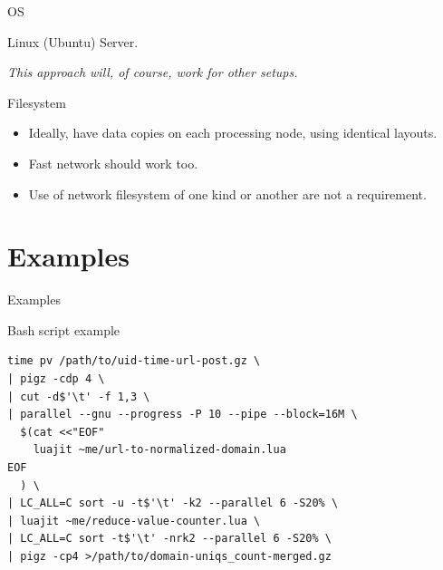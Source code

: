 \documentclass[handout]{beamer}
\begin{document}

\begin{frame}{OS}

\Large Linux (Ubuntu) Server.

\textit{This approach will, of course, work for other setups.}

\end{frame}


\begin{frame}{Filesystem}

\begin{itemize}
\item Ideally, have data copies on each processing node, using identical
      layouts.
\item Fast network should work too.
\item Use of network filesystem of one kind or another are not a requirement.
\end{itemize}

\end{frame}


\section{Examples}


\begin{frame}
\huge Examples
\end{frame}


\begin{frame}[fragile]{Bash script example}

\begin{verbatim}
time pv /path/to/uid-time-url-post.gz \
| pigz -cdp 4 \
| cut -d$'\t' -f 1,3 \
| parallel --gnu --progress -P 10 --pipe --block=16M \
  $(cat <<"EOF"
    luajit ~me/url-to-normalized-domain.lua
EOF
  ) \
| LC_ALL=C sort -u -t$'\t' -k2 --parallel 6 -S20% \
| luajit ~me/reduce-value-counter.lua \
| LC_ALL=C sort -t$'\t' -nrk2 --parallel 6 -S20% \
| pigz -cp4 >/path/to/domain-uniqs_count-merged.gz
\end{verbatim}

\end{frame}
\end{document}
